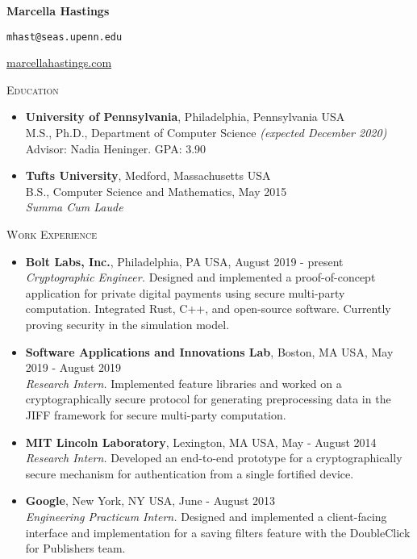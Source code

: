 \documentclass{article}
\newcommand{\textbox}[1]{\parbox{.333\textwidth}{#1}}
\begin{document}
\pagestyle{empty}
\noindent\textbox{\textbf{Marcella Hastings}\hfill}\textbox{\centering \texttt{mhast@seas.upenn.edu}}\textbox{\hfill \href{http://marcellahastings.com}{marcellahastings.com}}

\hrulefill

\textsc{Education}
\begin{itemize}[label={}]
  \item \textbf{University of Pennsylvania}, Philadelphia, Pennsylvania USA \\
    M.S., Ph.D., Department of Computer Science \textit{(expected December 2020)}\\
    Advisor: Nadia Heninger. GPA: 3.90
    
  \item \textbf{Tufts University}, Medford, Massachusetts USA \\
    B.S., Computer Science and Mathematics, May 2015 \\
    \textit{Summa Cum Laude}
\end{itemize}

\textsc{Work Experience} \hrulefill
\begin{itemize}[label={}]
  \item \textbf{Bolt Labs, Inc.}, Philadelphia, PA USA, August 2019 - present\\
  \textit{Cryptographic Engineer.} Designed and implemented a proof-of-concept application for private digital payments using secure multi-party computation. Integrated Rust, C++, and open-source software. Currently proving security in the simulation model.
  \item \textbf{Software Applications and Innovations Lab}, Boston, MA USA, May 2019 - August 2019\\
  \textit{Research Intern.} Implemented feature libraries and worked on a cryptographically secure protocol for generating preprocessing data in the JIFF framework for secure multi-party computation.
  \item \textbf{MIT Lincoln Laboratory}, Lexington, MA USA, May - August 2014 \\
  \textit{Research Intern.} Developed an end-to-end prototype for a cryptographically secure mechanism for authentication from a single fortified device.
  \item \textbf{Google}, New York, NY USA, June - August 2013\\
  \textit{Engineering Practicum Intern.} Designed and implemented a client-facing interface and implementation for a saving filters feature with the DoubleClick for Publishers team.
\end{itemize}
\end{document}
